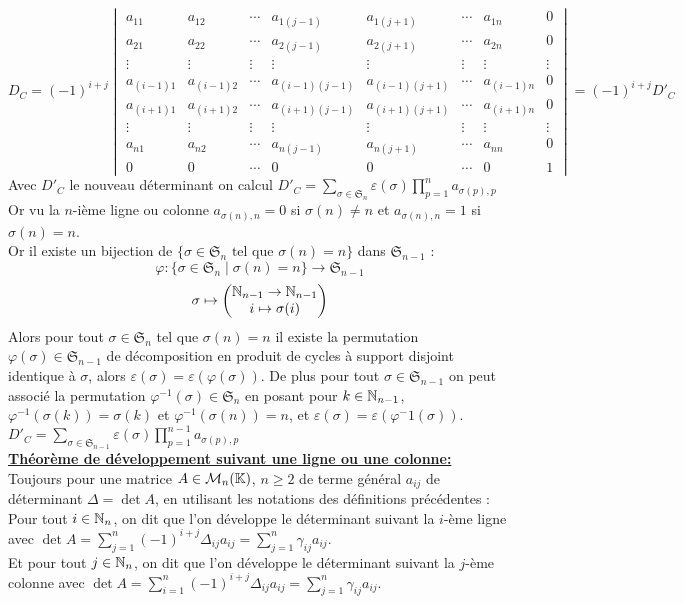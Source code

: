$$D_C=(-1)^{i+j}\begin{vmatrix}
		a_{11} & a_{12} & \cdots &a_{1(j-1)}&a_{1(j+1)}& \cdots & a_{1n} & 0 \\
	a_{21} & a_{22} & \cdots & a_{2(j-1)} &a_{2(j+1)}& \cdots & a_{2n}&0 \\
	\vdots & \vdots & \vdots & \vdots & \vdots & \vdots & \vdots & \vdots  \\
	a_{(i-1)1} & a_{(i-1)2} & \cdots & a_{(i-1)(j-1)} &a_{(i-1)(j+1)}& \cdots & a_{(i-1)n} & 0 \\
	a_{(i+1)1} & a_{(i+1)2} & \cdots & a_{(i+1)(j-1)} &a_{(i+1)(j+1)}& \cdots & a_{(i+1)n} & 0\\
	\vdots & \vdots & \vdots & \vdots & \vdots & \vdots & \vdots & \vdots  \\
	a_{n1} & a_{n2} & \cdots &a_{n(j-1)} &a_{n(j+1)}& \cdots & a_{nn} & 0 \\
	0&0&\cdots&0&0&\cdots&0&1
\end{vmatrix}=(-1)^{i+j}D'_C$$
Avec $D'_C$ le nouveau déterminant on calcul $\displaystyle D'_C=\sum_{\sigma\in\mathfrak{S}_n}\varepsilon(\sigma)\prod_{p=1}^n a_{\sigma(p),p}$\\
Or vu la $n$-ième ligne ou colonne $a_{\sigma(n),n}=0$ si $\sigma(n)\neq n$ et $a_{\sigma(n),n}=1$ si $\sigma(n)= n$.\\
Or il existe un bijection de $\{\sigma\in\mathfrak{S}_n \text { tel que } \sigma(n)=n\}$ dans $\mathfrak{S}_{n-1}$ : $$ \varphi : \{\sigma\in\mathfrak{S}_n \mid \sigma(n)=n\}\to \mathfrak{S}_{n-1}$$
$$\sigma\mapsto \begin{pmatrix}
	\mathbb{N}_{n-1}\to\mathbb{N}_{n-1}\\
	i\mapsto \sigma(i)
\end{pmatrix}$$
Alors pour tout $\sigma\in \mathfrak{S}_n$ tel que $\sigma(n)=n$ il existe la permutation $\varphi(\sigma)\in\mathfrak{S}_{n-1}$ de décomposition en produit de cycles à support disjoint identique à $\sigma$, alors $\varepsilon(\sigma)=\varepsilon(\varphi(\sigma))$. De plus pour tout $\sigma\in\mathfrak{S}_{n-1}$ on peut associé la permutation $\varphi^{-1}(\sigma)\in\mathfrak{S}_n$ en posant pour $k\in\mathbb{N}_{n-1}$, $\varphi^{-1}(\sigma(k))=\sigma(k)$ et $\varphi^{-1}(\sigma(n))=n$, et $\varepsilon(\sigma)=\varepsilon(\varphi^-1(\sigma))$.\\
$\displaystyle D'_C=\sum_{\sigma\in\mathfrak{S}_{n-1}}\varepsilon(\sigma)\prod_{p=1}^{n-1} a_{\sigma(p),p}$\\

\textbf{\underline{Théorème de développement suivant une ligne ou une colonne:}}\\
Toujours pour une matrice $A\in\mathcal{M}_n(\mathbb{K})$, $n\geq2$ de terme général $a_{ij}$ de déterminant $\Delta=\det A$, en utilisant les notations des définitions précédentes :\\
Pour tout $i\in\mathbb{N}_n$, on dit que l'on développe le déterminant suivant la $i$-ème ligne avec $\displaystyle \det A=\sum_{j=1}^n (-1)^{i+j}\Delta_{ij}a_{ij}=\sum_{j=1}^n \gamma_{ij}a_{ij}$.\\
Et pour tout $j\in\mathbb{N}_n$, on dit que l'on développe le déterminant suivant la $j$-ème colonne avec $\displaystyle \det A=\sum_{i=1}^n (-1)^{i+j}\Delta_{ij}a_{ij}=\sum_{j=1}^n \gamma_{ij}a_{ij}$.\\

